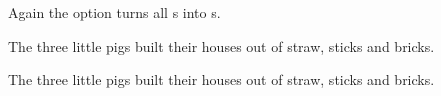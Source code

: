 \documentclass[toc=index,toc=bib]{cnpkgdoc}
\begin{document}
Again the  option turns all s into s.
\begin{beispiel}
 \begin{minipage}[t]{.4\linewidth}
  \noindent The three little pigs built their houses
  out of straw,
  sticks
  and bricks.
  
  \parnotes
 \end{minipage}\hfil
 \begin{minipage}[t]{.4\linewidth}
  \noindent The three little pigs built their houses
  out of straw,
  sticks
  and bricks.
  
  \parnotes
 \end{minipage}
\end{beispiel}


\appendix
\printbibliography
\printindex
\end{document}
